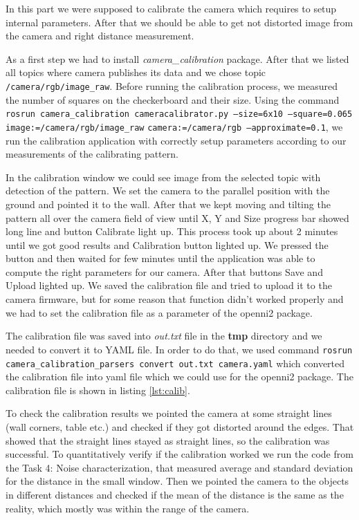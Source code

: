 \documentclass[11pt]{article}
\begin{document}
In this part we were supposed to calibrate the camera which requires to setup
internal parameters. After that we should be able to get not distorted image
from the camera and right distance measurement. \par

As a first step we had to install \emph{camera\_calibration} package. After that
we listed all topics where camera publishes its data and we chose topic
\texttt{/camera/rgb/image\_raw}. Before running the calibration process, we
measured the number of squares on the checkerboard and their size. Using the
command \texttt{rosrun camera\_calibration cameracalibrator.py --size=6x10
  --square=0.065 image:=/camera/rgb/image\_raw}{ } \texttt{camera:=/camera/rgb
  --approximate=0.1}, we run the calibration application with correctly setup
parameters according to our measurements of the calibrating pattern. \par

In the calibration window we could see image from the selected topic with
detection of the pattern. We set the camera to the parallel position with the
ground and pointed it to the wall. After that we kept moving and tilting the
pattern all over the camera field of view until X, Y and Size progress bar
showed long line and button Calibrate light up. This process took up about 2
minutes until we got good results and Calibration button lighted up. We pressed
the button and then waited for few minutes until the application was able to
compute the right parameters for our camera. After that buttons Save and Upload
lighted up. We saved the calibration file and tried to upload it to the camera
firmware, but for some reason that function didn't worked properly and we had to
set the calibration file as a parameter of the openni2 package. \par
        
The calibration file was saved into \emph{out.txt} file in the \textbf{tmp}
directory and we needed to convert it to YAML file. In order to do that, we used
command \texttt{rosrun camera\_calibration\_parsers convert out.txt camera.yaml}
which converted the calibration file into yaml file which we could use for the
openni2 package. The calibration file is shown in listing \vref{lst:calib}. \par
        
To check the calibration results we pointed the camera at some straight lines
(wall corners, table etc.) and checked if they got distorted around the
edges. That showed that the straight lines stayed as straight lines, so the
calibration was successful. To quantitatively verify if the calibration worked
we run the code from the Task 4: Noise characterization, that measured average
and standard deviation for the distance in the small window. Then we pointed the
camera to the objects in different distances and checked if the mean of the
distance is the same as the reality, which mostly was within the range of the
camera. \par
	
\end{document}
